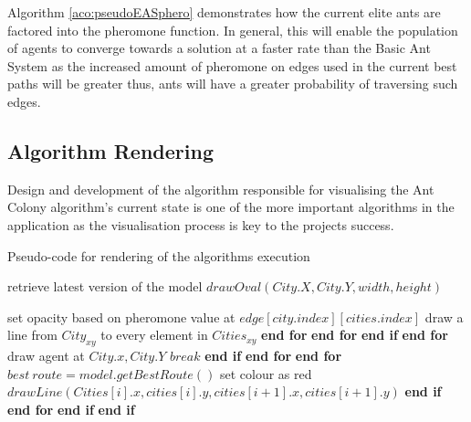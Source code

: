 Algorithm \ref{aco:pseudoEASphero} demonstrates how the current elite ants are factored into the pheromone function. In general, this will enable the population of agents to converge towards a solution at a faster rate than the Basic Ant System as the increased amount of pheromone on edges used in the current best paths will be greater thus, ants will have a greater probability of traversing such edges.

\subsection{Algorithm Rendering}

Design and development of the algorithm responsible for visualising the Ant Colony algorithm's current state  is one of the more important algorithms in the application as the visualisation process is key to the projects success.

\begin{algorithm}[H]
\caption[Algorithm Visualisation Pseudo-code]{Pseudo-code for rendering of the algorithms execution}
\label{aco:renderPesudo}
\begin{algorithmic}[1]

\State retrieve latest version of the model
\State $drawOval(City.X, City.Y, width, height)$

\State set opacity based on pheromone value at $edge[city.index][cities.index]$
\State draw a line from $City_{xy}$ to every element in $Cities_{xy}$
\EndFor 
\State \textbf{end for}
\EndFor 
\State \textbf{end for}
\EndIf
\State \textbf{end if}
\EndFor
\State \textbf{end for}
\State draw agent at $City.x, City.Y$
\State $break$
\EndIf
\State \textbf{end if}
\EndFor
\State \textbf{end for}
\EndFor
\State \textbf{end for}
\State $best\ route = model.getBestRoute()$
\State set colour as red
\State $drawLine(Cities[i].x, cities[i].y, cities[i + 1].x, cities[i + 1].y)$
\EndIf
\State \textbf{end if}
\EndFor
\State \textbf{end for}
\EndIf
\State \textbf{end if}
\EndIf
\State \textbf{end if}

\end{algorithmic}
\end{algorithm}

